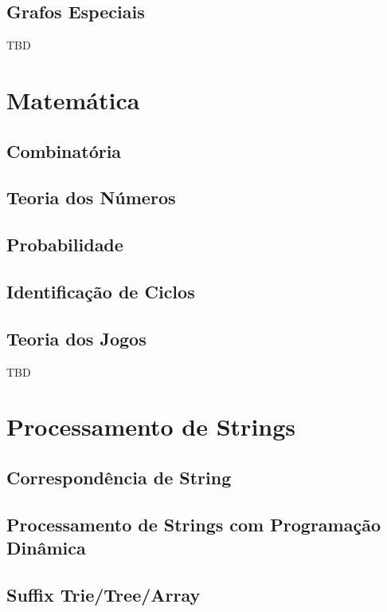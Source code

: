 \documentclass[11pt]{scrartcl}
\begin{document}
\subsection{Grafos Especiais}

TBD


\section{Matemática}

\subsection{Combinatória}

\subsection{Teoria dos Números}

\subsection{Probabilidade}

\subsection{Identificação de Ciclos}

\subsection{Teoria dos Jogos}

TBD


\section{Processamento de Strings}

\subsection{Correspondência de String}

\subsection{Processamento de Strings com Programação Dinâmica}

\subsection{Suffix Trie/Tree/Array}
\end{document}
